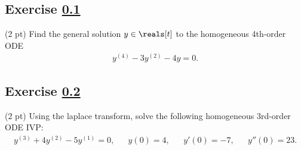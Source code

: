 \newpage

\subsection{Exercise \ref{sec : Differential Equations Q3}}
\label{sec : Differential Equations Q3}


(2 pt) Find the general solution $y \in \reals[t]$ to the homogeneous 4th-order ODE
\begin{align*}
y^{(4)} - 3 y^{(2)} - 4 y
=
0.
\end{align*}




\subsection{Exercise \ref{sec : Differential Equations Q4}}
\label{sec : Differential Equations Q4}


(2 pt) Using the laplace transform, solve the following homogeneous 3rd-order ODE IVP:
\begin{align*}
y^{(3)} + 4 y^{(2)} - 5 y^{(1)}
=
0,
&&
y(0)
=
4,
&&
y'(0)
=
-7,
&&
y''(0)
=
23.
\end{align*}

